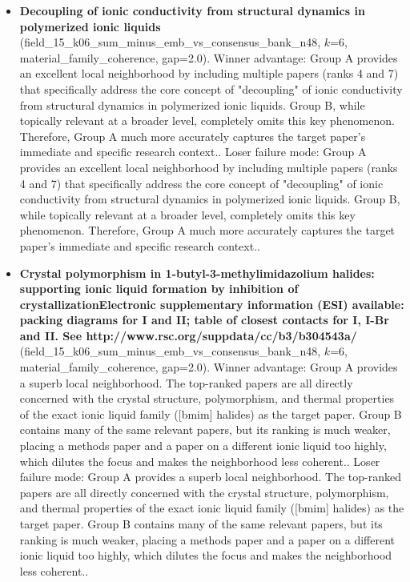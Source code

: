 \begin{itemize}
\item \textbf{Decoupling of ionic conductivity from structural dynamics in polymerized ionic liquids} (field\_15\_k06\_sum\_minus\_emb\_vs\_consensus\_bank\_n48, $k$=6, material\_family\_coherence, gap=2.0). Winner advantage: Group A provides an excellent local neighborhood by including multiple papers (ranks 4 and 7) that specifically address the core concept of "decoupling" of ionic conductivity from structural dynamics in polymerized ionic liquids. Group B, while topically relevant at a broader level, completely omits this key phenomenon. Therefore, Group A much more accurately captures the target paper's immediate and specific research context.. Loser failure mode: Group A provides an excellent local neighborhood by including multiple papers (ranks 4 and 7) that specifically address the core concept of "decoupling" of ionic conductivity from structural dynamics in polymerized ionic liquids. Group B, while topically relevant at a broader level, completely omits this key phenomenon. Therefore, Group A much more accurately captures the target paper's immediate and specific research context..
\item \textbf{Crystal polymorphism in 1-butyl-3-methylimidazolium halides: supporting ionic liquid formation by inhibition of crystallizationElectronic supplementary information (ESI) available: packing diagrams for I and II; table of closest contacts for I, I-Br and II. See http://www.rsc.org/suppdata/cc/b3/b304543a/} (field\_15\_k06\_sum\_minus\_emb\_vs\_consensus\_bank\_n48, $k$=6, material\_family\_coherence, gap=2.0). Winner advantage: Group A provides a superb local neighborhood. The top-ranked papers are all directly concerned with the crystal structure, polymorphism, and thermal properties of the exact ionic liquid family ([bmim] halides) as the target paper. Group B contains many of the same relevant papers, but its ranking is much weaker, placing a methods paper and a paper on a different ionic liquid too highly, which dilutes the focus and makes the neighborhood less coherent.. Loser failure mode: Group A provides a superb local neighborhood. The top-ranked papers are all directly concerned with the crystal structure, polymorphism, and thermal properties of the exact ionic liquid family ([bmim] halides) as the target paper. Group B contains many of the same relevant papers, but its ranking is much weaker, placing a methods paper and a paper on a different ionic liquid too highly, which dilutes the focus and makes the neighborhood less coherent..
\end{itemize}
